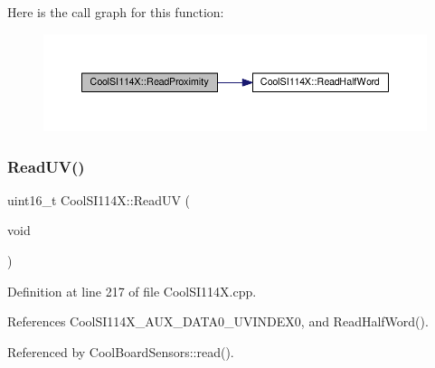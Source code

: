 Here is the call graph for this function\+:
\nopagebreak
\begin{figure}[H]
\begin{center}
\leavevmode
\includegraphics[width=350pt]{dd/d67/class_cool_s_i114_x_a194fede1105508c7803dbb567cbdcc67_cgraph}
\end{center}
\end{figure}
\mbox{\label{class_cool_s_i114_x_a14ced664d74e93438440b0274109c111}} 
\subsubsection{\texorpdfstring{Read\+U\+V()}{ReadUV()}}
{\footnotesize\ttfamily uint16\+\_\+t Cool\+S\+I114\+X\+::\+Read\+UV (\begin{DoxyParamCaption}\item[{void}]{ }\end{DoxyParamCaption})}



Definition at line 217 of file Cool\+S\+I114\+X.\+cpp.



References Cool\+S\+I114\+X\+\_\+\+A\+U\+X\+\_\+\+D\+A\+T\+A0\+\_\+\+U\+V\+I\+N\+D\+E\+X0, and Read\+Half\+Word().



Referenced by Cool\+Board\+Sensors\+::read().

